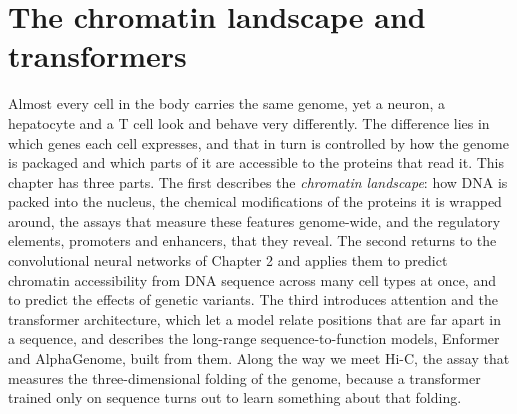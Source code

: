 
\providecommand{\R}{\mathbb{R}}
\providecommand{\E}{\mathbb{E}}
\providecommand{\Normal}{\mathcal{N}}
\providecommand{\argmax}{\operatorname*{arg\,max}}
\providecommand{\argmin}{\operatorname*{arg\,min}}
\providecommand{\vy}{\mathbf{y}}
\providecommand{\vx}{\mathbf{x}}
\providecommand{\mX}{\mathbf{X}}
\providecommand{\mI}{\mathbf{I}}
\providecommand{\vb}{\boldsymbol{\beta}}
\providecommand{\veps}{\boldsymbol{\epsilon}}
\providecommand{\vp}{\mathbf{p}}
\providecommand{\vg}{\mathbf{g}}
\providecommand{\ind}{\mathbf{1}}
\providecommand{\vh}{\mathbf{h}}
\providecommand{\vq}{\mathbf{q}}
\providecommand{\vk}{\mathbf{k}}
\providecommand{\vv}{\mathbf{v}}
\providecommand{\vz}{\mathbf{z}}
\providecommand{\ve}{\mathbf{e}}
\providecommand{\va}{\mathbf{a}}
\providecommand{\vs}{\mathbf{s}}
\providecommand{\mH}{\mathbf{H}}
\providecommand{\mQ}{\mathbf{Q}}
\providecommand{\mK}{\mathbf{K}}
\providecommand{\mV}{\mathbf{V}}
\providecommand{\mA}{\mathbf{A}}
\providecommand{\mG}{\mathbf{G}}
\providecommand{\mS}{\mathbf{S}}
\providecommand{\mW}{\mathbf{W}}
\providecommand{\mR}{\mathbf{R}}
\providecommand{\mPi}{\boldsymbol{\Pi}}
\providecommand{\softmax}{\operatorname{softmax}}

\providecommand{\chaptertoc}{}
\chapter{The chromatin landscape and transformers}
\label{ch:chromatin}
\chaptertoc

Almost every cell in the body carries the same genome, yet a neuron, a hepatocyte and a T cell look and behave very differently. The difference lies in which genes each cell expresses, and that in turn is controlled by how the genome is packaged and which parts of it are accessible to the proteins that read it. This chapter has three parts. The first describes the \emph{chromatin landscape}: how DNA is packed into the nucleus, the chemical modifications of the proteins it is wrapped around, the assays that measure these features genome-wide, and the regulatory elements, promoters and enhancers, that they reveal. The second returns to the convolutional neural networks of Chapter 2 and applies them to predict chromatin accessibility from DNA sequence across many cell types at once, and to predict the effects of genetic variants. The third introduces attention and the transformer architecture, which let a model relate positions that are far apart in a sequence, and describes the long-range sequence-to-function models, Enformer and AlphaGenome, built from them. Along the way we meet Hi-C, the assay that measures the three-dimensional folding of the genome, because a transformer trained only on sequence turns out to learn something about that folding.

